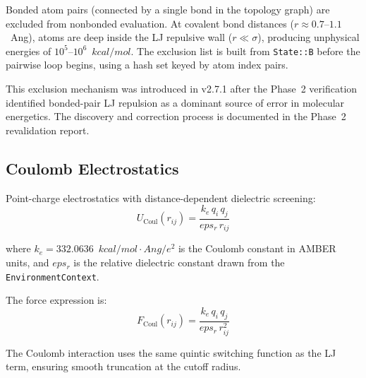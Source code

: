 \documentclass[11pt,twoside]{article}
\def\AA{Ang}%
\def\varepsilon{eps}%
\def\kcalmol{kcal/mol}%
\def\Angstrom{Ang}%
\newcommand{\Angstrom}{\text{\AA}}
\newcommand{\kcalmol}{\text{kcal/mol}}
\newcommand{\type}[1]{\texttt{#1}}
\newcommand{\field}[1]{\texttt{#1}}
\begin{document}
Bonded atom pairs (connected by a single bond in the topology graph) are excluded from nonbonded evaluation. At covalent bond distances ($r \approx 0.7$--$1.1$~\AA), atoms are deep inside the LJ repulsive wall ($r \ll \sigma$), producing unphysical energies of $10^5$--$10^6$~$\kcalmol$. The exclusion list is built from \field{State::B} before the pairwise loop begins, using a hash set keyed by atom index pairs.

This exclusion mechanism was introduced in v2.7.1 after the Phase~2 verification identified bonded-pair LJ repulsion as a dominant source of error in molecular energetics. The discovery and correction process is documented in the Phase~2 revalidation report.

\subsection{Coulomb Electrostatics}

Point-charge electrostatics with distance-dependent dielectric screening:
\begin{equation}
  U_{\mathrm{Coul}}(r_{ij}) = \frac{k_e \, q_i \, q_j}{\varepsilon_r \, r_{ij}}
  \label{eq:coulomb}
\end{equation}

where $k_e = 332.0636$~$\kcalmol \cdot \Angstrom / e^2$ is the Coulomb constant in AMBER units, and $\varepsilon_r$ is the relative dielectric constant drawn from the \type{EnvironmentContext}.

The force expression is:
\begin{equation}
  F_{\mathrm{Coul}}(r_{ij}) = \frac{k_e \, q_i \, q_j}{\varepsilon_r \, r_{ij}^2}
  \label{eq:coulomb-force}
\end{equation}

The Coulomb interaction uses the same quintic switching function as the LJ term, ensuring smooth truncation at the cutoff radius.
\end{document}
